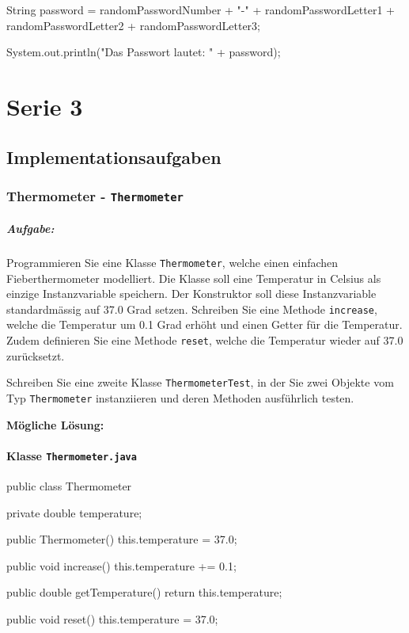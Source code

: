 \documentclass[a4paper,10pt, dvipsnames]{report}
\begin{document}
\begin{javacodebox}
{{        String password = randomPasswordNumber + "-" + randomPasswordLetter1 +
						  randomPasswordLetter2 + randomPasswordLetter3;

        System.out.println("Das Passwort lautet: " + password);
    }
}
\end{javacodebox}

\chapter{Serie 3}
\section{Implementationsaufgaben}
\subsection{Thermometer - \texttt{Thermometer}}

\paragraph{Aufgabe:}
Programmieren Sie eine Klasse \texttt{Thermometer}, welche einen einfachen Fieberthermometer modelliert. Die Klasse soll eine Temperatur in Celsius als einzige Instanzvariable speichern. Der Konstruktor soll diese Instanzvariable standardmässig auf 37.0 Grad setzen. Schreiben Sie eine Methode \texttt{increase}, welche die Temperatur um 0.1 Grad erhöht und einen Getter für die Temperatur. Zudem definieren Sie eine Methode \texttt{reset}, welche die Temperatur wieder auf 37.0 zurücksetzt.

Schreiben Sie eine zweite Klasse \texttt{ThermometerTest}, in der Sie zwei Objekte vom Typ \texttt{Thermometer} instanziieren und deren Methoden ausführlich testen.

\textbf{Mögliche Lösung:}

\subsubsection{Klasse \texttt{Thermometer.java}}

\begin{javacodebox}
public class Thermometer {
    
    private double temperature;

    public Thermometer() {
        this.temperature = 37.0;
    }

    public void increase() {
        this.temperature += 0.1;
    }

    public double getTemperature() {
        return this.temperature;
    }

    public void reset() {
        this.temperature = 37.0;
    }
}
\end{javacodebox}
\end{document}
